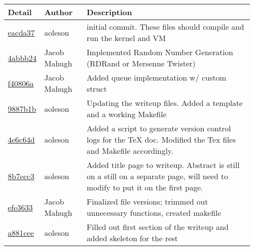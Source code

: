 \begin{tabular}{l l l}\textbf{Detail} & \textbf{Author} & \textbf{Description}\\\hline
\href{git@github.com:aoleson/cs444/commit/eacda375043af0c890654149a289a781c0d558cf}{eacda37} & aoleson & initial commit. These files should compile and run the kernel and VM\\\hline
\href{git@github.com:aoleson/cs444/commit/4abbb240a90bdba422c608f9917f45b501decaac}{4abbb24} & Jacob Mahugh & Implemented Random Number Generation (RDRand or Mersenne Twister)\\\hline
\href{git@github.com:aoleson/cs444/commit/f40806a12aac697608b0364de9c29d803cbb688f}{f40806a} & Jacob Mahugh & Added queue implementation w/ custom struct\\\hline
\href{git@github.com:aoleson/cs444/commit/9887b1bce65d52ad32789073e14cdbdf505287cb}{9887b1b} & aoleson & Updating the writeup files. Added a template and a working Makefile\\\hline
\href{git@github.com:aoleson/cs444/commit/4e6c64d648c1ebccc697c451c50de5077be7ca20}{4e6c64d} & aoleson & Added a script to generate version control logs for the TeX doc. Modified the Tex files and Makefile accordingly.\\\hline
\href{git@github.com:aoleson/cs444/commit/8b7ecc3f64e5c56b29ca5f6f38a7992d4476c72c}{8b7ecc3} & aoleson & Added title page to writeup. Abstract is still on a still on a separate page, will need to modify to put it on the first page.\\\hline
\href{git@github.com:aoleson/cs444/commit/efe3633ebe7f21d53cfa58ea1648db660104e052}{efe3633} & Jacob Mahugh & Finalized file versions; trimmed out unnecessary functions, created makefile\\\hline
\href{git@github.com:aoleson/cs444/commit/a881cee4d8422c40bff2419b07f2f16a1456b713}{a881cee} & aoleson & Filled out first section of the writeup and added skeleton for the rest\\\hline\end{tabular}
